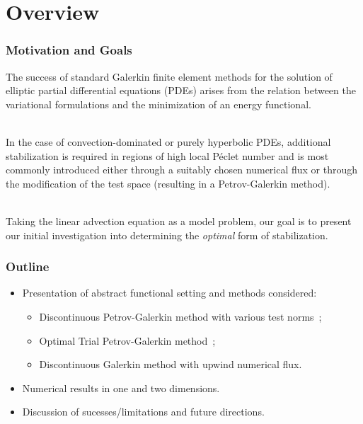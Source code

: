 \section{Overview}

\begin{frame}
\frametitle{Motivation and Goals}

The success of standard Galerkin finite element methods for the solution of
elliptic partial differential equations (PDEs) arises from the relation between
the variational formulations and the minimization of an energy functional.
\\~

In the case of convection-dominated or purely hyperbolic PDEs, additional
stabilization is required in regions of high local P\'eclet number and is most
commonly introduced either through a suitably chosen numerical flux or through
the modification of the test space (resulting in a Petrov-Galerkin method).
\\~

Taking the linear advection equation as a model problem, our goal is to present
our initial investigation into determining the \emph{optimal} form of
stabilization.

\end{frame}

\begin{frame}
\frametitle{Outline}

\begin{itemize}
\item Presentation of abstract functional setting and methods considered:
\begin{itemize}
\item Discontinuous Petrov-Galerkin method with various test norms~\cite{Demkowicz2011};
\item Optimal Trial Petrov-Galerkin method~\cite{Brunken2018};
\item Discontinuous Galerkin method with upwind numerical flux.
\end{itemize}
\item Numerical results in one and two dimensions.
\item Discussion of sucesses/limitations and future directions.
\end{itemize}

\end{frame}